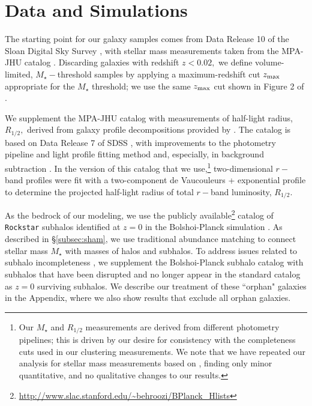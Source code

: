 \documentclass[usenatbib,usegraphicx,letterpaper]{mn2e}
\newcommand{\rhalf}{R_{1/2}}
\newcommand{\mstar}{M_{\star}}
\begin{document}
\section{Data and Simulations}
\label{sec:data}

The starting point for our galaxy samples comes from Data Release 10 of the Sloan Digital Sky Survey \citep[SDSS,][]{ahn_etal14}, with stellar mass measurements taken from the MPA-JHU catalog \citep{kauffmann_etal03,brinchmann_etal04}. Discarding galaxies with redshift $z<0.02,$ we define volume-limited, $\mstar-$threshold samples by applying a maximum-redshift cut $z_{\rm max}$ appropriate for the $\mstar$ threshold; we use the same $z_{\rm max}$ cut shown in Figure 2 of \citet{behroozi_etal15}.

We supplement the MPA-JHU catalog with measurements of half-light radius, $\rhalf,$ derived from galaxy profile decompositions provided by \citet{meert_etal15}. The \citet{meert_etal15} catalog is based on Data Release 7 of SDSS \citep{abazajian_etal09}, with improvements to the photometry pipeline and light profile fitting method and, especially, in background subtraction \citep{vikram_etal10,bernardi_etal13,bernardi_etal14,meert_etal13}. In the version of this catalog that we use,\footnote{Our $\mstar$ and $\rhalf$ measurements are derived from different photometry pipelines; this is driven by our desire for consistency with the \citet{behroozi_etal15} completeness cuts used in our clustering measurements. We note that we have repeated our analysis for stellar mass measurements based on \citet{meert_etal15}, finding only minor quantitative, and no qualitative changes to our results.} two-dimensional $r-$band profiles were fit with a two-component de Vaucouleurs + exponential profile to determine the projected half-light radius of total $r-$band luminosity, $\rhalf.$

As the bedrock of our modeling, we use the publicly available\footnote{\url{http://www.slac.stanford.edu/~behroozi/BPlanck\_Hlists}} catalog of {\tt Rockstar} subhalos identified at $z=0$ in the Bolshoi-Planck simulation \citep{klypin_etal11,klypin_etal16,behroozi12_rockstar,riebe_etal13,behroozi_etal12b,rodriguez_puebla16_bolplanck}. As described in \S\ref{subsec:sham}, we use traditional abundance matching to connect stellar mass $\mstar$ with masses of halos and subhalos. To address issues related to subhalo incompleteness \citep{guo_white13,campbell_etal17}, we supplement the Bolshoi-Planck subhalo catalog with subhalos that have been disrupted and no longer appear in the standard catalog as $z=0$ surviving subhalos. We describe our treatment of these ``orphan" galaxies in the Appendix, where we also show results that exclude all orphan galaxies.
\end{document}
